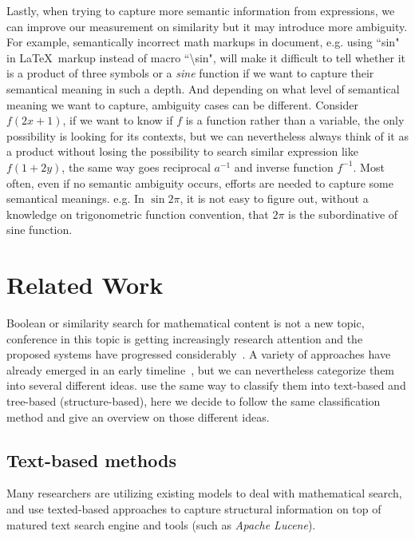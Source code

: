 Lastly, when trying to capture more semantic information from expressions, we can improve our measurement on similarity but it may introduce more ambiguity. 
For example, semantically incorrect math markups in document, e.g. using ``sin" in \LaTeX\ markup instead of macro ``\textbackslash sin", will make it difficult to tell whether it is a product of three symbols or a \textit{sine} function if we want to capture their semantical meaning in such a depth. 
And depending on what level of semantical meaning we want to capture, ambiguity cases can be different. 
Consider $f(2x+1)$, if we want to know if $f$ is a function rather than a variable, the only possibility is looking for its contexts, but we can nevertheless always think of it as a product without losing the possibility to search similar expression like $f(1 + 2y)$, the same way goes reciprocal $a^{-1}$ and inverse function $f^{-1}$. 
Most often, even if no semantic ambiguity occurs, efforts are needed to capture some semantical meanings. e.g. In $\sin 2 \pi$, it is not easy to figure out,
 without a knowledge on trigonometric function convention, that $2 \pi$ is the subordinative of sine function.


\section{Related Work}
\label{relatedwork}
Boolean or similarity search for mathematical content is not a new topic, conference in this topic is getting increasingly research attention and the proposed systems have progressed considerably~\cite{ov}. 
A variety of approaches have already emerged in an early timeline~\cite{egomath13}, but we can nevertheless categorize them into several different ideas.
\cite{WikiMirs13,symbolpairs15,Youssef14} use the same way to classify them into text-based and tree-based (structure-based),
here we decide to follow the same classification method and give an overview on those different ideas.

\subsection{Text-based methods}
Many researchers are utilizing existing models to deal with mathematical search, and use texted-based approaches to capture structural information on top of matured text search engine and tools (such as \textit{Apache Lucene}). 


